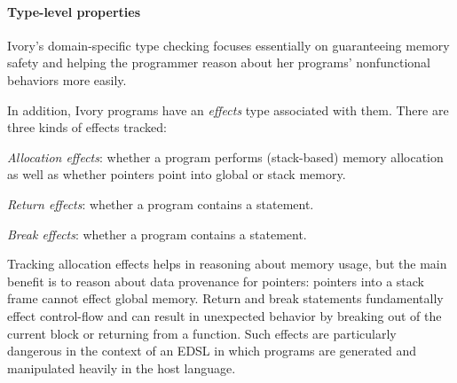 
\paragraph{Type-level properties}


Ivory's domain-specific type checking focuses essentially on guaranteeing memory
safety and helping the programmer reason about her programs' nonfunctional
behaviors more easily.



In addition, Ivory programs have an \emph{effects} type associated with them.
There are three kinds of effects tracked:
\begin{compactitem}
  \item \emph{Allocation effects}: whether a program performs (stack-based)
    memory allocation as well as whether pointers point into global or stack memory.
  \item \emph{Return effects}: whether a program contains a  statement.
  \item \emph{Break effects}: whether a program contains a 
    statement.
\end{compactitem}
\noindent
Tracking allocation effects helps in reasoning about memory usage, but the main
benefit is to reason about data provenance for pointers: pointers into a stack
frame cannot effect global memory.  Return and break statements fundamentally
effect control-flow and can result in unexpected behavior by breaking out of the
current block or returning from a function.  Such effects are particularly
dangerous in the context of an EDSL in which programs are generated and
manipulated heavily in the host language.

